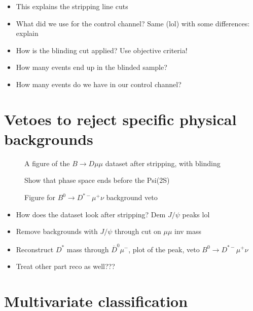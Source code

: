 \begin{itemize}
  \item This explains the stripping line cuts
  \item What did we use for the control channel? Same (lol) with some differences: explain
  \item How is the blinding cut applied? Use objective criteria!
  \item How many events end up in the blinded sample?
  \item How many events do we have in our control channel?
\end{itemize}

\section{Vetoes to reject specific physical backgrounds}

\begin{figure}
  \centering
  \missingfigure[figwidth=\textwidth]{}
  \caption{A figure of the $B\to Dμμ$ dataset after stripping, with blinding}
\end{figure}

\begin{figure}
  \centering
  \missingfigure[figwidth=\textwidth]{}
  \caption{Show that phase space ends before the Psi(2S)}
\end{figure}

\begin{figure}
  \centering
  \missingfigure[figwidth=\textwidth]{}
  \caption{Figure for $B^0\to D^{*-}μ^+ν$ background veto}
\end{figure}

\begin{itemize}
  \item How does the dataset look after stripping? Dem $J/ψ$ peaks lol
  \item Remove backgrounds with $J/ψ$ through cut on $μμ$ inv mass
  \item Reconstruct $D^*$ mass through $\overline{D}^0μ^-$, plot of the peak, veto $B^0\to D^{*-}μ^+ν$
  \item Treat other part reco as well???
\end{itemize}

\section{Multivariate classification}

